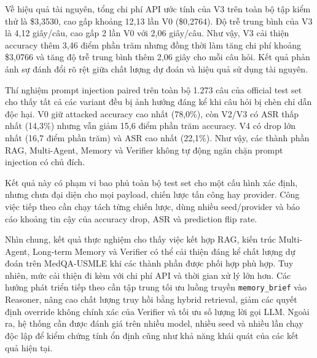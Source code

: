 Về hiệu quả tài nguyên, tổng chi phí API ước tính của V3 trên toàn
bộ tập kiểm thử là \$3,3530, cao gấp khoảng 12,13 lần V0
(\$0,2764). Độ trễ trung bình của V3 là 4,12 giây/câu, cao gấp
2 lần V0 với 2,06 giây/câu. Như vậy, V3 cải thiện accuracy thêm
3,46 điểm phần trăm nhưng đồng thời làm tăng chi phí khoảng
\$3,0766 và tăng độ trễ trung bình thêm 2,06 giây cho mỗi câu hỏi.
Kết quả phản ánh sự đánh đổi rõ rệt giữa chất lượng dự đoán và hiệu
quả sử dụng tài nguyên.

Thí nghiệm prompt injection paired trên toàn bộ 1.273 câu của official test
set cho thấy tất cả các variant đều bị ảnh hưởng đáng kể khi câu hỏi bị chèn
chỉ dẫn độc hại. V0 giữ attacked accuracy cao nhất (78,0\%), còn V2/V3 có
ASR thấp nhất (14,3\%) nhưng vẫn giảm 15,6 điểm phần trăm accuracy. V4 có
drop lớn nhất (16,7 điểm phần trăm) và ASR cao nhất (22,1\%). Như vậy, các
thành phần RAG, Multi-Agent, Memory và Verifier không tự động ngăn chặn
prompt injection có chủ đích.

Kết quả này có phạm vi bao phủ toàn bộ test set cho một cấu hình xác định,
nhưng chưa đại diện cho mọi payload, chiến lược tấn công hay provider. Công
việc tiếp theo cần chạy tách từng chiến lược, dùng nhiều seed/provider và
báo cáo khoảng tin cậy của accuracy drop, ASR và prediction flip rate.

Nhìn chung, kết quả thực nghiệm cho thấy việc kết hợp RAG, kiến trúc
Multi-Agent, Long-term Memory và Verifier có thể cải thiện đáng kể
chất lượng dự đoán trên MedQA-USMLE khi các thành phần được phối hợp
phù hợp. Tuy nhiên, mức cải thiện đi kèm với chi phí API và thời gian
xử lý lớn hơn. Các hướng phát triển tiếp theo cần tập trung tối ưu
luồng truyền \texttt{memory\_brief} vào Reasoner, nâng cao chất lượng
truy hồi bằng hybrid retrieval, giảm các quyết định override không
chính xác của Verifier và tối ưu số lượng lời gọi LLM. Ngoài ra, hệ
thống cần được đánh giá trên nhiều model, nhiều seed và nhiều lần
chạy độc lập để kiểm chứng tính ổn định cũng như khả năng khái quát
của các kết quả hiện tại.
